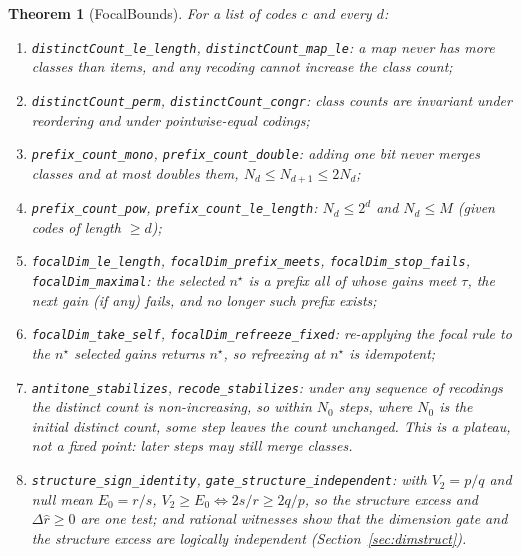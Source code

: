 \documentclass[11pt,a4paper]{article}
\theoremstyle{plain}
\newtheorem{theorem}{Theorem}
\theoremstyle{remark}
\begin{document}
\begin{theorem}[FocalBounds]
For a list of codes $c$ and every $d$:
{\sloppy
\begin{enumerate}
\item \texttt{distinctCount\_le\_length}, \texttt{distinctCount\_map\_le}: a map never has more classes than items, and any recoding cannot increase the class count;
\item \texttt{distinctCount\_perm}, \texttt{distinctCount\_congr}: class counts are invariant under reordering and under pointwise-equal codings;
\item \texttt{prefix\_count\_mono}, \texttt{prefix\_count\_double}: adding one bit never merges classes and at most doubles them, $N_d\le N_{d+1}\le2N_d$;
\item \texttt{prefix\_count\_pow}, \texttt{prefix\_count\_le\_length}: $N_d\le2^d$ and $N_d\le M$ (given codes of length $\ge d$);
\item \texttt{focalDim\_le\_length}, \texttt{focalDim\_prefix\_meets}, \texttt{focalDim\_stop\_fails}, \texttt{focalDim\_maximal}: the selected $n^\star$ is a prefix all of whose gains meet $\tau$, the next gain (if any) fails, and no longer such prefix exists;
\item \texttt{focalDim\_take\_self}, \texttt{focalDim\_refreeze\_fixed}: re-applying the focal rule to the $n^\star$ selected gains returns $n^\star$, so refreezing at $n^\star$ is idempotent;
\item \texttt{antitone\_stabilizes}, \texttt{recode\_stabilizes}: under any sequence of recodings the distinct count is non-increasing, so within $N_0$ steps, where $N_0$ is the initial distinct count, some step leaves the count unchanged. This is a plateau, not a fixed point: later steps may still merge classes.
\item \texttt{structure\_sign\_identity}, \texttt{gate\_structure\_independent}: with $V_2=p/q$ and null mean $E_0=r/s$, $V_2\ge E_0\iff 2s/r\ge 2q/p$, so the structure excess and $\Delta\hat r\ge0$ are one test; and rational witnesses show that the dimension gate and the structure excess are logically independent (Section~\ref{sec:dimstruct}).
\end{enumerate}\par}
\end{theorem}
\end{document}

